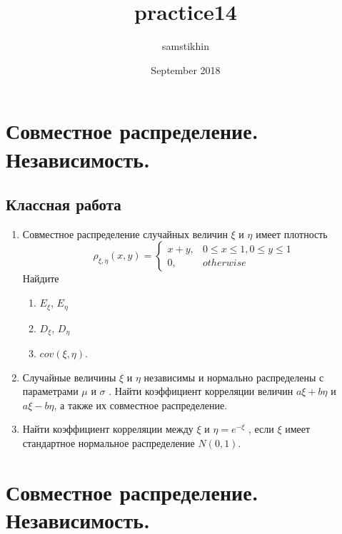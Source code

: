 \documentclass[a4paper, 14pt]{extarticle}
\title{practice14}
\author{samstikhin}
\date{September 2018}
\begin{document}
\section*{Совместное распределение. Независимость.}
\subsection*{Классная работа}
\begin{enumerate}
\item Совместное распределение случайных величин $\xi$ и $\eta$ имеет плотность
$$\rho_{\xi,\eta}(x,y) =\left\{
	\begin{array}{cc}
	x+y, & 0\leq x\leq 1, 0\leq y\leq 1 \\
	0, & otherwise
	\end{array}\right.$$
Найдите 
\begin{enumerate}
\item $E_{\xi}$, $E_{\eta}$
\item $D_{\xi}$, $D_{\eta}$
\item $cov(\xi,\eta)$.
\end{enumerate}
\item Случайные величины $\xi$ и $\eta$ независимы и нормально распределены с параметрами $\mu$ и $\sigma$ . Найти коэффициент корреляции величин
$a\xi + b\eta$ и $a\xi - b\eta$, а также их совместное распределение.
\item Найти коэффициент корреляции между $\xi$ и $\eta = e^{-\xi}$ , если 
$\xi$ имеет стандартное нормальное распределение $N(0,1)$.

\end{enumerate}

\newpage

\section*{Совместное распределение. Независимость.}
\end{document}
